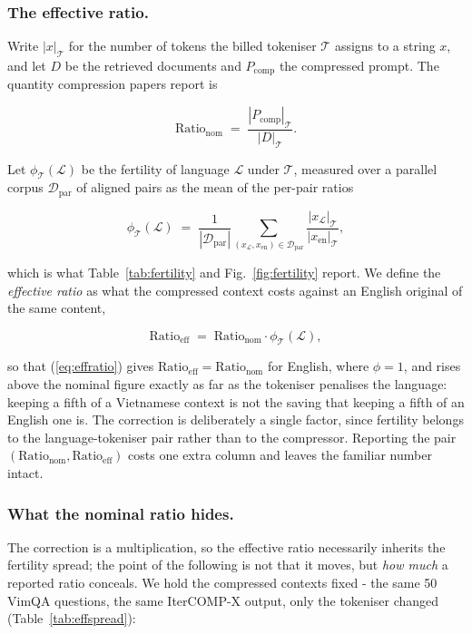 \documentclass{llncs}
\begin{document}
\subsubsection{The effective ratio.}
\label{sec:effratio}

Write $|x|_{\mathcal{T}}$ for the number of tokens the billed tokeniser
$\mathcal{T}$ assigns to a string $x$, and let $D$ be the retrieved documents and
$P_{\text{comp}}$ the compressed prompt. The quantity compression papers report is

\begin{equation}
\text{Ratio}_{\text{nom}} \;=\; \frac{|P_{\text{comp}}|_{\mathcal{T}}}{|D|_{\mathcal{T}}} .
\end{equation}

Let $\phi_{\mathcal{T}}(\mathcal{L})$ be the fertility of language $\mathcal{L}$
under $\mathcal{T}$, measured over a parallel corpus
$\mathcal{D}_{\text{par}}$ of aligned pairs as the mean of the per-pair ratios

\begin{equation}
\phi_{\mathcal{T}}(\mathcal{L}) \;=\;
\frac{1}{|\mathcal{D}_{\text{par}}|}
\sum_{(x_{\mathcal{L}}, x_{\text{en}}) \in \mathcal{D}_{\text{par}}}
\frac{|x_{\mathcal{L}}|_{\mathcal{T}}}{|x_{\text{en}}|_{\mathcal{T}}} ,
\label{eq:fert}
\end{equation}

which is what Table~\ref{tab:fertility} and Fig.~\ref{fig:fertility}
report. We define the \emph{effective ratio} as what the compressed context
costs against an English original of the same content,

\begin{equation}
\text{Ratio}_{\text{eff}} \;=\;
\text{Ratio}_{\text{nom}} \cdot \phi_{\mathcal{T}}(\mathcal{L}) ,
\label{eq:effratio}
\end{equation}

so that (\ref{eq:effratio}) gives $\text{Ratio}_{\text{eff}} =
\text{Ratio}_{\text{nom}}$ for English, where $\phi = 1$, and rises above the
nominal figure exactly as far as the tokeniser penalises the language: keeping a
fifth of a Vietnamese context is not the saving that keeping a fifth of an English one
is. The correction is deliberately a single factor, since fertility belongs to
the language-tokeniser pair rather than to the compressor. Reporting the pair
$(\text{Ratio}_{\text{nom}}, \text{Ratio}_{\text{eff}})$ costs one extra column
and leaves the familiar number intact.

\subsubsection{What the nominal ratio hides.}
The correction is a multiplication, so the effective ratio necessarily inherits
the fertility spread; the point of the following is not that it moves, but
\emph{how much} a reported ratio conceals. We hold the compressed contexts fixed
- the same 50 VimQA questions, the same IterCOMP-X output, only the tokeniser
changed (Table~\ref{tab:effspread}):
\end{document}
